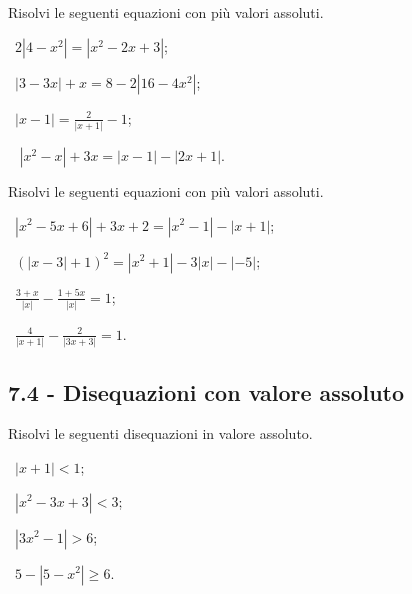 \begin{esercizio}[\Ast]
 \label{ese:7.29}
Risolvi le seguenti equazioni con più valori assoluti.
\begin{multicols}{2}
 \begin{enumeratea}
 \item~$2\left|4-x^2\right|=\left|x^2-2x+3\right|$;
 \item~$\left|3-3x\right|+x=8-2\left|16-4x^2\right|$;
 \item~$\left|x-1\right|=\frac 2 {\left|x+1\right|}-1$;
 \item~ $\left|x^2-x\right|+3x=\left|x-1\right|-\left|2x+1\right|$.
 \end{enumeratea}
 \end{multicols}
\end{esercizio}

\begin{esercizio}[\Ast]
 \label{ese:7.30}
Risolvi le seguenti equazioni con più valori assoluti.
 \begin{enumeratea}
\item~$\left|x^2-5x+6\right|+3x+2=\left|x^2-1\right|-\left|x+1\right|$;
\item~$\left(\left|x-3\right|+1\right)^2=\left|x^2+1\right|-3\left|x\right|-\left|-5\right|$;
\item~$\frac{3+x}{\left|x\right|}-\frac{1+5x}{|x|}=1$;
\item~$\frac{4}{\left|x+1\right|}-\frac{2}{|3x+3|}=1$.
 \end{enumeratea}
\end{esercizio}

\subsection*{7.4 - Disequazioni con valore assoluto}

\begin{esercizio}[\Ast]
 \label{ese:7.31}
Risolvi le seguenti disequazioni in valore assoluto.
\begin{multicols}{2}
 \begin{enumeratea}
 \item~$\left|x+1\right|<1$;
 \item~$\left|x^2-3x+3\right|<3$;
 \item~$\left|3x^2-1\right|>6$;
 \item~$5-\left|5-x^2\right|\ge 6$.
 \end{enumeratea}
 \end{multicols}
\end{esercizio}

